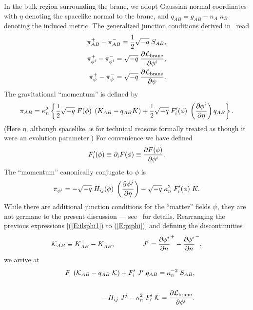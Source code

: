 \documentclass[a4paper,10pt]{article}
\begin{document}
In the bulk region surrounding the brane, we adopt Gaussian normal
coordinates with $\eta$ denoting the spacelike normal to the brane,
and $q_{AB} = g_{AB} - n_A\; n_B$ denoting the induced metric.  The
generalized junction conditions derived in~\cite{generalized-junction}
read
%
\begin{eqnarray}
\pi^{+}_{AB}- \pi^{-}_{AB}
=
{1 \over 2}  \sqrt{-q}  \;S_{AB}, 
\label{E:ilsphi1}
\\ 
\pi^{+}_{\phi^i}-\pi^{-}_{\phi^i}
= 
\sqrt{-q} \; 
{\partial {\mathcal L}_{\mathrm{brane}} \over \partial \phi^i},
\label{E:ilsphi2}
\\ 
\pi^{+}_{\psi}-\pi^{-}_{\psi}
= 
\sqrt{-q} \; 
{\partial {\mathcal L}_{\mathrm{brane}} \over \partial \psi}.
\label{E:ilsphi3}
\end{eqnarray}
% 
The gravitational ``momentum'' is defined
by~\cite{generalized-junction}
%
\begin{equation}
\pi_{AB}
=
\kappa_n^2 \left\{
{1 \over 2} \sqrt{-q} \; F(\phi)\; \left(K_{AB}-q_{AB}K\right)
+{1 \over 2} \sqrt{-q} \; F'_i(\phi)\; 
\left({\partial\phi^i\over\partial\eta}\right) q_{AB}
\right\}.
\label{E:pigphi} 
\end{equation}
%
(Here $\eta$, although spacelike, is for technical reasons formally
treated as though it were an evolution parameter.)  For convenience we
have defined
%
\begin{equation}
 F'_i(\phi) \equiv \partial_i F(\phi) 
\equiv {\partial F(\phi)\over\partial\phi^i}.
\end{equation}
%
The ``momentum'' canonically conjugate to $\phi$
is~\cite{generalized-junction}
%
\begin{equation}
\pi_{\phi^i}
=
-\sqrt{-q}\;H_{ij}(\phi)\; \left({\partial\phi^j\over\partial\eta}\right) 
-\sqrt{-q}\; \kappa_n^2 \;F'_i(\phi)\; K.
\label{E:piphi}
\end{equation}
%
While there are additional junction conditions for the ``matter''
fields $\psi$, they are not germane to the present discussion ---
see~\cite{generalized-junction} for details.  Rearranging the previous
expressions [(\ref{E:ilsphi1}) to (\ref{E:piphi})] and defining the
discontinuities
%
\begin{equation}
{\mathcal K}_{AB} \equiv K_{AB}^+ - K_{AB}^-, 
\qquad \qquad 
J^i = {\partial\phi^i\over\partial n}^+ -  {\partial\phi^i\over\partial n}^-,
\end{equation}
%
we arrive at
%
\begin{eqnarray}
&&
F \; \left({\mathcal K}_{AB} - q_{AB} \; {\mathcal K}\right) 
+ F'_i \; J^i \; q_{AB} 
=  \kappa_n^{-2}  \;S_{AB},
\label{E:j1}
\\
\nonumber
\\
&&
-H_{ij} \; J^j - \kappa_n^2 \; F'_i \; {\mathcal K} = 
{\partial {\mathcal L}_{\mathrm{brane}} \over \partial \phi^i}.
\label{E:j2}
\end{eqnarray}
\end{document}
